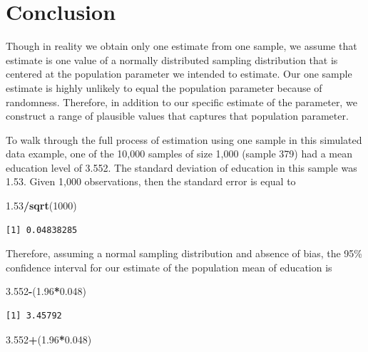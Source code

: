\documentclass[
]{book}
\makeatletter
\newenvironment{Shaded}{\begin{snugshade}}{\end{snugshade}}
\newcommand{\DecValTok}[1]{\textcolor[rgb]{0.06,0.06,0.06}{#1}}
\newcommand{\FloatTok}[1]{\textcolor[rgb]{0.06,0.06,0.06}{#1}}
\newcommand{\FunctionTok}[1]{\textcolor[rgb]{0.27,0.27,0.27}{\textbf{#1}}}
\newcommand{\NormalTok}[1]{#1}
\newcommand{\SpecialCharTok}[1]{\textcolor[rgb]{0.43,0.43,0.43}{\textbf{#1}}}
\newenvironment{kframe}{%
\medskip{}
\setlength{\fboxsep}{.8em}
 \def\at@end@of@kframe{}%
 \ifinner\ifhmode%
  \def\at@end@of@kframe{\end{minipage}}%
  \begin{minipage}{\columnwidth}%
 \fi\fi%
 \def\FrameCommand##1{\hskip\@totalleftmargin \hskip-\fboxsep
 \colorbox{shadecolor}{##1}\hskip-\fboxsep
     \hskip-\linewidth \hskip-\@totalleftmargin \hskip\columnwidth}%
 \MakeFramed {\advance\hsize-\width
   \@totalleftmargin\z@ \linewidth\hsize
   \@setminipage}}%
 {\par\unskip\endMakeFramed%
 \at@end@of@kframe}
\renewenvironment{Shaded}{\begin{kframe}}{\end{kframe}}
\makeatother
\begin{document}
\hypertarget{conclusion}{%
\section{Conclusion}\label{conclusion}}

Though in reality we obtain only one estimate from one sample, we assume that estimate is one value of a normally distributed sampling distribution that is centered at the population parameter we intended to estimate. Our one sample estimate is highly unlikely to equal the population parameter because of randomness. Therefore, in addition to our specific estimate of the parameter, we construct a range of plausible values that captures that population parameter.

To walk through the full process of estimation using one sample in this simulated data example, one of the 10,000 samples of size 1,000 (sample 379) had a mean education level of 3.552. The standard deviation of education in this sample was 1.53. Given 1,000 observations, then the standard error is equal to

\begin{Shaded}
\begin{Highlighting}[]
\FloatTok{1.53}\SpecialCharTok{/}\FunctionTok{sqrt}\NormalTok{(}\DecValTok{1000}\NormalTok{)}
\end{Highlighting}
\end{Shaded}

\begin{verbatim}
[1] 0.04838285
\end{verbatim}

Therefore, assuming a normal sampling distribution and absence of bias, the 95\% confidence interval for our estimate of the population mean of education is

\begin{Shaded}
\begin{Highlighting}[]
\FloatTok{3.552}\SpecialCharTok{{-}}\NormalTok{(}\FloatTok{1.96}\SpecialCharTok{*}\FloatTok{0.048}\NormalTok{)}
\end{Highlighting}
\end{Shaded}

\begin{verbatim}
[1] 3.45792
\end{verbatim}

\begin{Shaded}
\begin{Highlighting}[]
\FloatTok{3.552}\SpecialCharTok{+}\NormalTok{(}\FloatTok{1.96}\SpecialCharTok{*}\FloatTok{0.048}\NormalTok{)}
\end{Highlighting}
\end{Shaded}
\end{document}

